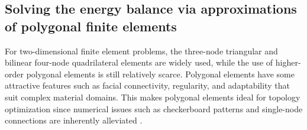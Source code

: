 \subsection[Solving the energy balance via polygonal elements]{Solving the energy balance via approximations of polygonal finite elements}
For two-dimensional finite element problems, the three-node triangular and bilinear four-node quadrilateral elements are widely used, while the use of higher-order polygonal elements is still relatively scarce. Polygonal elements have some attractive features such as facial connectivity, regularity, and adaptability that suit complex material domains. This makes polygonal elements ideal for topology optimization since numerical issues such as checkerboard patterns and single-node connections are inherently alleviated \cite{Talischi2012,Gain2013Dec}. 

